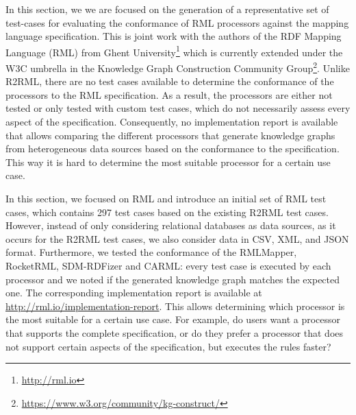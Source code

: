 In this section, we we are focused on the generation of a representative set of test-cases for evaluating the conformance of RML processors against the mapping language specification. This is joint work with the authors of the RDF Mapping Language (RML) from Ghent University\footnote{\url{http://rml.io}} which is currently extended under the W3C umbrella in the Knowledge Graph Construction Community Group\footnote{\url{https://www.w3.org/community/kg-construct/}}. Unlike R2RML, there are no test cases available to determine the conformance of the processors to the RML specification. As a result, the processors are either not tested or only tested with custom test cases, which do not necessarily assess every aspect of the specification. Consequently, no implementation report is available that allows comparing the different processors that generate knowledge graphs from heterogeneous data sources based on the conformance to the specification. This way it is hard to determine the most suitable processor for a certain use case.

In this section, we focused on RML and introduce an initial set of RML test cases, which contains 297 test cases based on the existing R2RML test cases. However, instead of only considering relational databases as data sources, as it occurs for the R2RML test cases, we also consider data in CSV, XML, and JSON format. Furthermore, we tested the conformance of the RMLMapper, RocketRML, SDM-RDFizer and CARML: every test case is executed by each processor and we noted if the generated knowledge graph matches the expected one. The corresponding implementation report is available at \url{http://rml.io/implementation-report}. This allows determining which processor is the most suitable for a certain use case. For example, do users want a processor that supports the complete specification, or do they prefer a processor that does not support certain aspects of the specification, but executes the rules faster?


